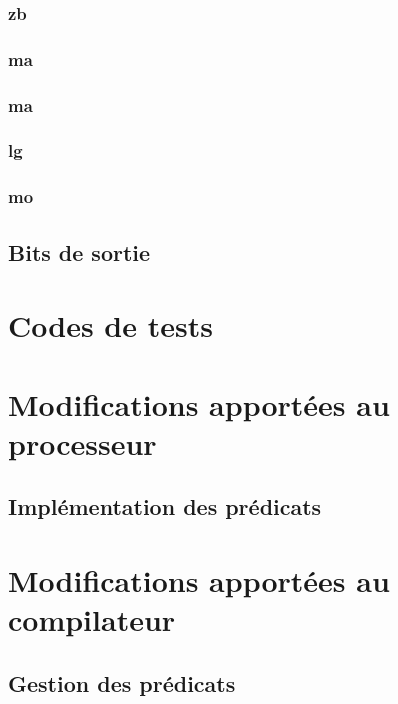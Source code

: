 \documentclass[11pt, a4paper, twoside, titlepage]{article}
\begin{document}
\subsubsection{zb}
\subsubsection{ma}
\subsubsection{ma}
\subsubsection{lg}
\subsubsection{mo}

\subsection{Bits de sortie}


\newpage
\section{Codes de tests}


\newpage
\section{Modifications apportées au processeur}


\subsection{Implémentation des prédicats}


\newpage
\section{Modifications apportées au compilateur}

\subsection{Gestion des prédicats}
\end{document}
